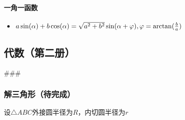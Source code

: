 \documentclass[
]{article}
\begin{document}
\hypertarget{ux4e00ux89d2ux4e00ux51fdux6570}{%
\paragraph{一角一函数}\label{ux4e00ux89d2ux4e00ux51fdux6570}}

\begin{itemize}
\item
  \(a\sin(\alpha) + b\cos(\alpha) = \sqrt{a^2 + b^2}\sin(\alpha + \varphi), \varphi = \arctan({b \over a})\)
\end{itemize}

\hypertarget{ux4ee3ux6570ux7b2cux4e8cux518cuxff09}{%
\subsection{代数（第二册）}\label{ux4ee3ux6570ux7b2cux4e8cux518cuxff09}}

\#\#\#

\hypertarget{ux89e3ux4e09ux89d2ux5f62ux5f85ux5b8cux6210uxff09}{%
\subsubsection{解三角形（待完成）}\label{ux89e3ux4e09ux89d2ux5f62ux5f85ux5b8cux6210uxff09}}

设\(\triangle ABC\)外接圆半径为\(R\)，内切圆半径为\(r\)
\end{document}
